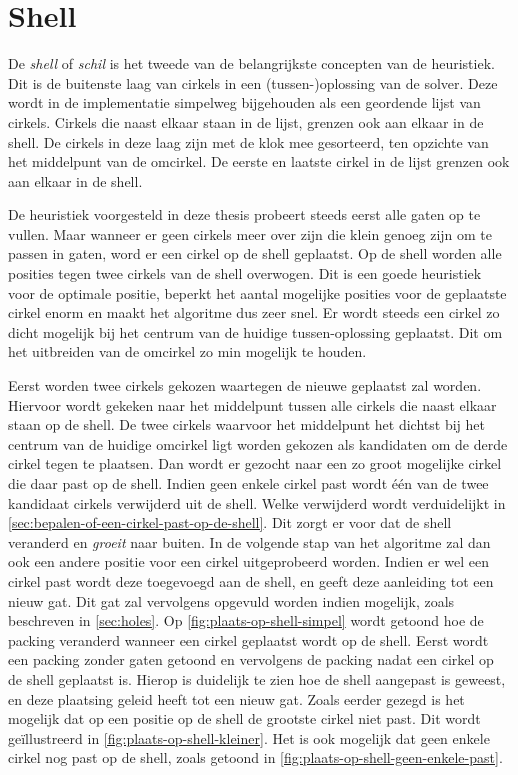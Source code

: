 \documentclass[12pt,a4paper,oneside]{book}
\begin{document}
\section{Shell} \label{sec:shell}

De \textit{shell} of \textit{schil} is het tweede van de belangrijkste concepten van de heuristiek.
Dit is de buitenste laag van cirkels in een (tussen-)oplossing van de solver.
Deze wordt in de implementatie simpelweg bijgehouden als een geordende lijst van cirkels.
Cirkels die naast elkaar staan in de lijst, grenzen ook aan elkaar in de shell.
De cirkels in deze laag zijn met de klok mee gesorteerd, ten opzichte van het middelpunt van de omcirkel.
De eerste en laatste cirkel in de lijst grenzen ook aan elkaar in de shell.

De heuristiek voorgesteld in deze thesis probeert steeds eerst alle gaten op te vullen.
Maar wanneer er geen cirkels meer over zijn die klein genoeg zijn om te passen in gaten, word er een cirkel op de shell geplaatst.
Op de shell worden alle posities tegen twee cirkels van de shell overwogen.
Dit is een goede heuristiek voor de optimale positie, beperkt het aantal mogelijke posities voor de geplaatste cirkel enorm en maakt het algoritme dus zeer snel.
Er wordt steeds een cirkel zo dicht mogelijk bij het centrum van de huidige tussen-oplossing geplaatst.
Dit om het uitbreiden van de omcirkel zo min mogelijk te houden.

Eerst worden twee cirkels gekozen waartegen de nieuwe geplaatst zal worden.
Hiervoor wordt gekeken naar het middelpunt tussen alle cirkels die naast elkaar staan op de shell.
De twee cirkels waarvoor het middelpunt het dichtst bij het centrum van de huidige omcirkel ligt worden gekozen als kandidaten om de derde cirkel tegen te plaatsen.
Dan wordt er gezocht naar een zo groot mogelijke cirkel die daar past op de shell.
Indien geen enkele cirkel past wordt één van de twee kandidaat cirkels verwijderd uit de shell.
Welke verwijderd wordt verduidelijkt in \autoref{sec:bepalen-of-een-cirkel-past-op-de-shell}.
Dit zorgt er voor dat de shell veranderd en \textit{groeit} naar buiten.
In de volgende stap van het algoritme zal dan ook een andere positie voor een cirkel uitgeprobeerd worden.
Indien er wel een cirkel past wordt deze toegevoegd aan de shell, en geeft deze aanleiding tot een nieuw gat.
Dit gat zal vervolgens opgevuld worden indien mogelijk, zoals beschreven in \autoref{sec:holes}.
Op \autoref{fig:plaats-op-shell-simpel} wordt getoond hoe de packing veranderd wanneer een cirkel geplaatst wordt op de shell.
Eerst wordt een packing zonder gaten getoond en vervolgens de packing nadat een cirkel op de shell geplaatst is.
Hierop is duidelijk te zien hoe de shell aangepast is geweest, en deze plaatsing geleid heeft tot een nieuw gat.
Zoals eerder gezegd is het mogelijk dat op een positie op de shell de grootste cirkel niet past.
Dit wordt geïllustreerd in \autoref{fig:plaats-op-shell-kleiner}.
Het is ook mogelijk dat geen enkele cirkel nog past op de shell, zoals getoond in \autoref{fig:plaats-op-shell-geen-enkele-past}.
\end{document}
